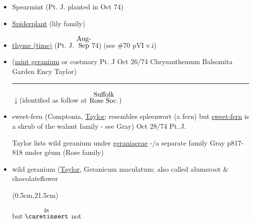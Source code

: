 \documentclass[a4paper,10pt]{article}
\begin{document}
\begin{flushleft}
\begin{itemize}
\ul{-issus} \ul{Kamm} p 206 illust \#25 Pt. J, planted\par 
\color{red}
\tiny
\newsavebox{\abc}
\begin{turn}{25}\usebox{\abc}\end{turn}
\color{blue}
\normalsize
Oct 18/74
\small
\color{red}
John Parkinson 1629 \ul{Paradisus Terrestis} ``The rarity \& novelty of this herb, being for the most part but in the gardens of great persons, doth cause it to be of great regard"
\color{blue}
\normalsize
\item Spearmint (Pt. J. planted in Oct 74)
\item \ul{Spiderplant} (lily family)
\item \ul{thyme (time)} (Pt. J. {$\stackrel{\hbox{Aug-}}{\hbox{Sep}}$}74) (see \#70 pVI v.i)
\item (\ul{mint geranium} or costmary Pt. J Oct 26/74 
Chrysanthemum Balsomita Garden Ency Taylor)
\rule{10cm}{0.01cm}
\begin{flushright}
$\downarrow$(identified as follow at {$\stackrel{\hbox{Suffolk}}{\hbox{Rose Soc.}}$})
\end{flushright}
\item sweet-fern (Comptonia, \ul{Taylor}; resembles spleenwort (a fern) but \ul{sweet-fern} is a shrub of the walnut family - see Gray)
Oct 28/74 Pt..J.\par
\color{red}
\footnotesize
Taylor lists wild geranium under \ul{geraniaceae} -/a separate family 
Gray p817-818 %
under g\'eum (Rose family)
\color{blue}
\normalsize
\item wild geranium (\ul{Taylor}, Geranicum maculatum; also called alumsroot \& chocolateflower\par
\color{red}
\begin{textblock*}{3.22in}(0.5cm,21.5cm)%
    \small
    \begin{minipage}{3.22in} 
        \color{red}
        but $\stackrel{\hbox{is}}{\hbox{$\caretinsert$}}$ not\par

\end{minipage}
\end{textblock*}
\end{itemize}
\end{flushleft}
\end{document}
